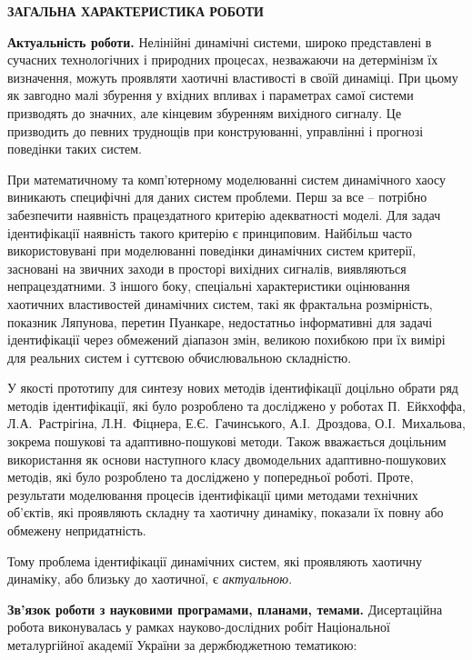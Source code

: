 \documentclass[a4paper,12pt]{atuaref}
\newcommand{\xsect}[1]{\medskip\begin{center}\textbf{#1}\end{center}\medskip\penalty10000}
\begin{document}
\vspace{2ex}

\clearpage


\setcounter{page}{1}

\xsect{ЗАГАЛЬНА ХАРАКТЕРИСТИКА РОБОТИ}

\textbf{Актуальність роботи.}
Нелінійні динамічні системи, широко представлені в сучасних технологічних і
природних процесах, незважаючи на детермінізм їх визначення, можуть проявляти
хаотичні властивості в своїй динаміці. При цьому як завгодно малі збурення у вхідних
впливах і параметрах самої системи призводять до значних, але кінцевим збуренням
вихідного сигналу. Це призводить до певних труднощів при конструюванні,
управлінні і прогнозі поведінки таких систем.

При математичному та комп'ютерному моделюванні систем динамічного хаосу
виникають специфічні для даних систем проблеми. Перш за все -- потрібно
забезпечити наявність працездатного критерію адекватності моделі. Для задач
ідентифікації наявність такого критерію є принциповим. Найбільш часто
використовувані при моделюванні поведінки динамічних систем критерії, засновані
на звичних заходи в просторі вихідних сигналів, виявляються непрацездатними. З
іншого боку, спеціальні характеристики оцінювання хаотичних властивостей динамічних
систем, такі як фрактальна розмірність, показник Ляпунова, перетин Пуанкаре,
недостатньо інформативні для задачі ідентифікації через обмежений діапазон
змін, великою похибкою при їх вимірі для реальних систем і суттєвою
обчислювальною складністю.

У якості прототипу для синтезу нових методів ідентифікації доцільно обрати ряд
методів ідентифікації, які було розроблено та досліджено у роботах
П.~Ейкхоффа, Л.А.~Растрігіна, Л.Н.~Фіцнера, Е.Є.~Гачинського,
А.І.~Дроздова, О.І.~Михальова, зокрема пошукові та адаптивно-пошукові
методи.
Також вважається доцільним використання як основи
наступного класу двомодельних адаптивно-пошукових методів,
які було розроблено та досліджено у попередньої роботі.
Проте, результати моделювання процесів ідентифікації цими методами
технічних об'єктів, які проявляють складну та хаотичну динаміку, показали
їх повну або обмежену непридатність.


Тому проблема ідентифікації динамічних систем, які проявляють хаотичну
динаміку, або близьку до хаотичної, є
\textit{актуальною}.

\smallskip
\textbf{Зв'язок роботи з науковими програмами, планами, темами.}
Дисертаційна робота виконувалась у рамках науково-дослідних робіт
Національної металургійної академії України за держбюджетною
тематикою:
\end{document}
